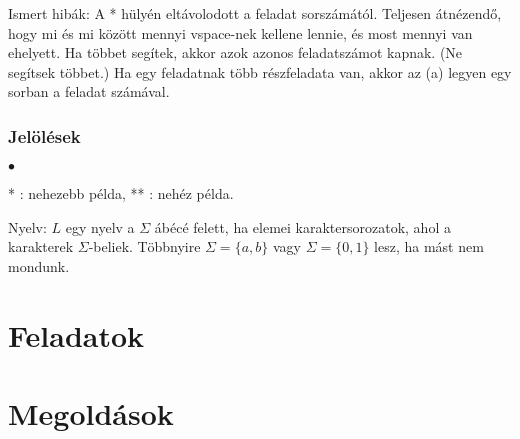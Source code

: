 \documentclass[11pt,a4paper,openany]{book}
\newcommand{\hard}{\!\!* }
\newcommand{\veryhard}{\!\!** }
\newcounter{sorszam}
\begin{document}
Ismert hibák: A \hard hülyén eltávolodott a feladat sorszámától. Teljesen átnézendő, hogy mi és mi között mennyi vspace-nek kellene lennie, és most mennyi van ehelyett. Ha többet segítek, akkor azok azonos feladatszámot kapnak. (Ne segítsek többet.) Ha egy feladatnak több részfeladata van, akkor az (a) legyen egy sorban a feladat számával.




\section*{Jelölések}

\bigskip
\begin{list}{$\bullet$}{\setlength{\leftmargin}{3ex}}
  \item %
      \hard: nehezebb példa, \veryhard: nehéz példa.
      
\item Nyelv: $L$ egy nyelv a $\Sigma$ ábécé felett, ha elemei karaktersorozatok, ahol a karakterek $\Sigma$-beliek. Többnyire $\Sigma=\{a,b\}$ vagy $\Sigma=\{0,1\}$ lesz, ha mást nem mondunk.
\end{list}



\part{Feladatok}




\makeatletter
\@AnswerOutputtrue\@ExerciseOutputfalse
\makeatother
\NotesOutputfalse
\setcounter{ExerciseCount}{0}
\setcounter{sorszam}{0}

\setcounter{chapter}{0}

\newpage


\part{Megoldások}



\newpage
{}
{}
\printindex
\end{document}
